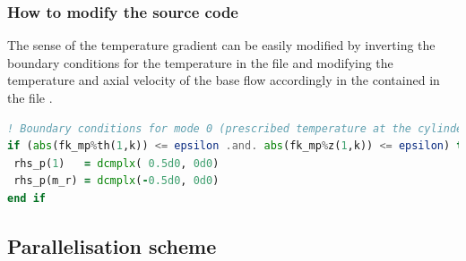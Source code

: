 \documentclass[a4paper, 11pt, DIV=11]{scrartcl}
\begin{document}
\subsubsection{How to modify the source code}

The sense of the temperature gradient can be easily modified by inverting
the boundary conditions for the temperature in the file 
and modifying the temperature and axial velocity of the base flow accordingly
in the  contained in the file .
\begin{lstlisting}[language=Fortran]
! Boundary conditions for mode 0 (prescribed temperature at the cylinders)
if (abs(fk_mp%th(1,k)) <= epsilon .and. abs(fk_mp%z(1,k)) <= epsilon) then
 rhs_p(1)   = dcmplx( 0.5d0, 0d0)
 rhs_p(m_r) = dcmplx(-0.5d0, 0d0)
end if
\end{lstlisting}


\subsection{Parallelisation scheme}
\label{sec:parallelisationScheme}
\end{document}
